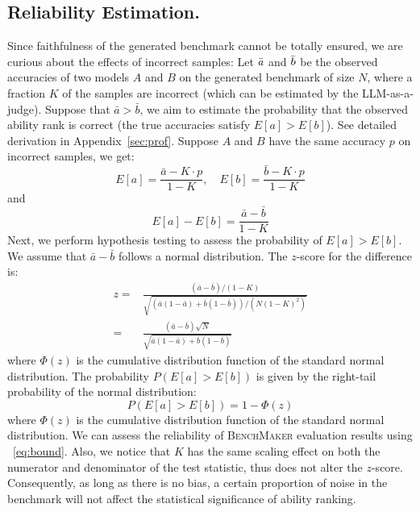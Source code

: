 \subsection{Reliability Estimation.}
Since faithfulness of the generated benchmark cannot be totally ensured, we are curious about the effects of incorrect samples:
Let $\Bar{a}$ and $\Bar{b}$ be the observed accuracies of two models $A$ and $B$ on the generated benchmark of size $N$, where a fraction $K$ of the samples are incorrect (which can be estimated by the LLM-as-a-judge). 
Suppose that $\bar{a}>\bar{b}$, we aim to estimate the probability that the observed ability rank is correct (the true accuracies satisfy $E[a] > E[b]$). See detailed derivation in Appendix~\ref{sec:prof}. Suppose $A$ and $B$ have the same accuracy $p$ on incorrect samples, we get:
\begin{equation}
E[a] = \frac{\bar{a} - K \cdot p}{1 - K}, \quad E[b] = \frac{\bar{b} - K \cdot p}{1 - K}
\end{equation}
and
\begin{equation}
E[a] - E[b] = \frac{\bar{a} - \bar{b}}{1 - K}
\end{equation}
Next, we perform hypothesis testing to assess the probability of \( E[a] > E[b] \). We assume that \( \bar{a} - \bar{b} \) follows a normal distribution. The \( z \)-score for the difference is:
\begin{equation}
\begin{split}
z =& \frac{(\bar{a} - \bar{b})/(1-K)}{\sqrt{(\bar{a}(1-\bar{a}) + \bar{b}(1-\bar{b}))/(N(1-K)^2)}} \\
=&\frac{(\bar{a} - \bar{b})\sqrt{N}}{\sqrt{\bar{a}(1-\bar{a}) + \bar{b}(1-\bar{b})}}
\end{split}
\end{equation}
where \( \Phi(z) \) is the cumulative distribution function of the standard normal distribution. 
The probability \( P(E[a] > E[b]) \) is given by the right-tail probability of the normal distribution:
\begin{equation}
P(E[a] > E[b]) = 1 - \Phi(z)
\label{eq:bound}
\end{equation}
where \( \Phi(z) \) is the cumulative distribution function of the standard normal distribution. 
We can assess the reliability of \textsc{BenchMaker} evaluation results using ~\eqref{eq:bound}.
Also, we notice that $K$ has the same scaling effect on both the numerator and denominator of the test statistic, thus does not alter the \( z \)-score. Consequently, as long as there is no bias, a certain proportion of noise in the benchmark will not affect the statistical significance of ability ranking.




